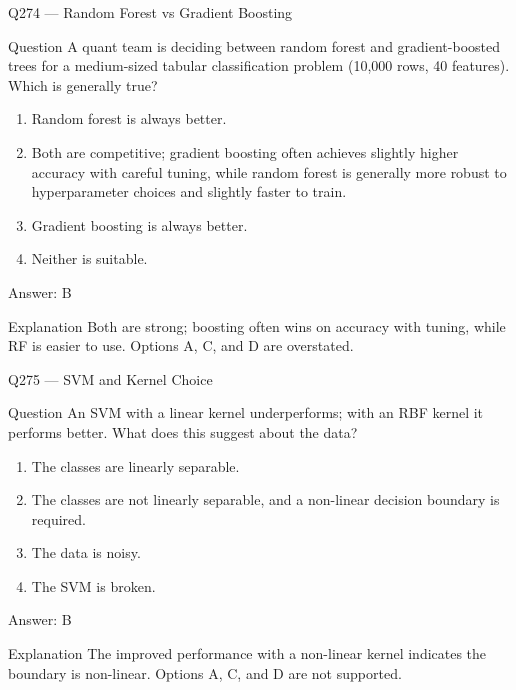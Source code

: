\documentclass[aspectratio=169,8pt]{beamer}
\begin{document}
\begin{frame}{Q274 --- Random Forest vs Gradient Boosting}
\begin{block}{Question}
A quant team is deciding between random forest and gradient-boosted trees for a medium-sized tabular classification problem (10,000 rows, 40 features). Which is generally true?
\end{block}
\begin{enumerate}
\item Random forest is always better.
\item Both are competitive; gradient boosting often achieves slightly higher accuracy with careful tuning, while random forest is generally more robust to hyperparameter choices and slightly faster to train.
\item Gradient boosting is always better.
\item Neither is suitable.
\end{enumerate}
\begin{exampleblock}{Answer: B}\end{exampleblock}
\begin{block}{Explanation}
Both are strong; boosting often wins on accuracy with tuning, while RF is easier to use. Options A, C, and D are overstated.
\end{block}
\end{frame}

\begin{frame}{Q275 --- SVM and Kernel Choice}
\begin{block}{Question}
An SVM with a linear kernel underperforms; with an RBF kernel it performs better. What does this suggest about the data?
\end{block}
\begin{enumerate}
\item The classes are linearly separable.
\item The classes are not linearly separable, and a non-linear decision boundary is required.
\item The data is noisy.
\item The SVM is broken.
\end{enumerate}
\begin{exampleblock}{Answer: B}\end{exampleblock}
\begin{block}{Explanation}
The improved performance with a non-linear kernel indicates the boundary is non-linear. Options A, C, and D are not supported.
\end{block}
\end{frame}
\end{document}
